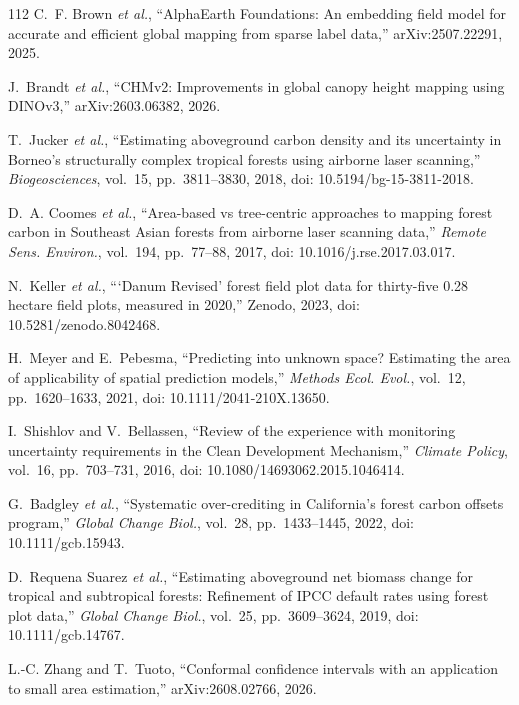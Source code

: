 \documentclass[conference,a4paper]{IEEEtran}
\begin{document}
\begin{thebibliography}{112}
C.~F. Brown \textit{et al.}, ``AlphaEarth Foundations: An embedding field model for accurate and efficient global mapping from sparse label data,'' arXiv:2507.22291, 2025.

J.~Brandt \textit{et al.}, ``CHMv2: Improvements in global canopy height mapping using DINOv3,'' arXiv:2603.06382, 2026.

T.~Jucker \textit{et al.}, ``Estimating aboveground carbon density and its uncertainty in Borneo's structurally complex tropical forests using airborne laser scanning,'' \textit{Biogeosciences}, vol.~15, pp.~3811--3830, 2018, doi: 10.5194/bg-15-3811-2018.

D.~A. Coomes \textit{et al.}, ``Area-based vs tree-centric approaches to mapping forest carbon in Southeast Asian forests from airborne laser scanning data,'' \textit{Remote Sens. Environ.}, vol.~194, pp.~77--88, 2017, doi: 10.1016/j.rse.2017.03.017.

N.~Keller \textit{et al.}, ```Danum Revised' forest field plot data for thirty-five 0.28 hectare field plots, measured in 2020,'' Zenodo, 2023, doi: 10.5281/zenodo.8042468.

H.~Meyer and E.~Pebesma, ``Predicting into unknown space? Estimating the area of applicability of spatial prediction models,'' \textit{Methods Ecol. Evol.}, vol.~12, pp.~1620--1633, 2021, doi: 10.1111/2041-210X.13650.

I.~Shishlov and V.~Bellassen, ``Review of the experience with monitoring uncertainty requirements in the Clean Development Mechanism,'' \textit{Climate Policy}, vol.~16, pp.~703--731, 2016, doi: 10.1080/14693062.2015.1046414.

G.~Badgley \textit{et al.}, ``Systematic over-crediting in California's forest carbon offsets program,'' \textit{Global Change Biol.}, vol.~28, pp.~1433--1445, 2022, doi: 10.1111/gcb.15943.

D.~Requena Suarez \textit{et al.}, ``Estimating aboveground net biomass change for tropical and subtropical forests: Refinement of IPCC default rates using forest plot data,'' \textit{Global Change Biol.}, vol.~25, pp.~3609--3624, 2019, doi: 10.1111/gcb.14767.

L.-C. Zhang and T.~Tuoto, ``Conformal confidence intervals with an application to small area estimation,'' arXiv:2608.02766, 2026.


\end{thebibliography}
\end{document}
